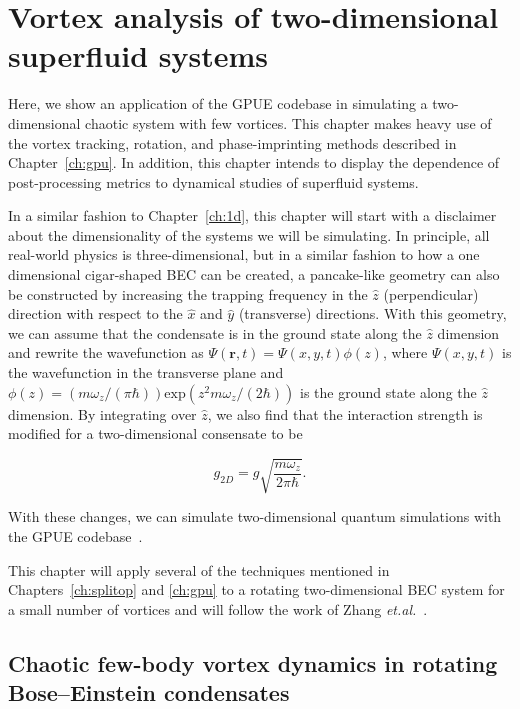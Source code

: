 \chapter{Vortex analysis of two-dimensional superfluid systems}
\label{ch:2d}

Here, we show an application of the GPUE codebase in simulating a two-dimensional chaotic system with few vortices.
This chapter makes heavy use of the vortex tracking, rotation, and phase-imprinting methods described in Chapter~\ref{ch:gpu}.
In addition, this chapter intends to display the dependence of post-processing metrics to dynamical studies of superfluid systems.

In a similar fashion to Chapter~\ref{ch:1d}, this chapter will start with a disclaimer about the dimensionality of the systems we will be simulating.
In principle, all real-world physics is three-dimensional, but in a similar fashion to how a one dimensional cigar-shaped BEC can be created, a pancake-like geometry can also be constructed by increasing the trapping frequency in the $\hat z$ (perpendicular) direction with respect to the $\hat x$ and $\hat y$ (transverse) directions.
With this geometry, we can assume that the condensate is in the ground state along the $\hat z$ dimension and rewrite the wavefunction as $\Psi(\mathbf{r},t) = \Psi(x, y, t)\phi(z)$, where $\Psi(x, y, t)$ is the wavefunction in the transverse plane and $\phi(z) = (m \omega_z/(\pi\hbar))\text{exp}(z^2 m\omega_z/(2\hbar))$ is the ground state along the $\hat z$ dimension.
By integrating over $\hat z$, we also find that the interaction strength is modified for a two-dimensional consensate to be

\begin{equation}
g_{2D} = g \sqrt{\frac{m\omega_z}{2\pi\hbar}}.
\end{equation}

\noindent With these changes, we can simulate two-dimensional quantum simulations with the GPUE codebase~\cite{zhang2019, o2017, o2016topo, o2016}.

This chapter will apply several of the techniques mentioned in Chapters~\ref{ch:splitop} and \ref{ch:gpu} to a rotating two-dimensional BEC system for a small number of vortices and will follow the work of Zhang \textit{et.al.}~\cite{zhang2019}.

\section{Chaotic few-body vortex dynamics in rotating Bose--Einstein condensates}

